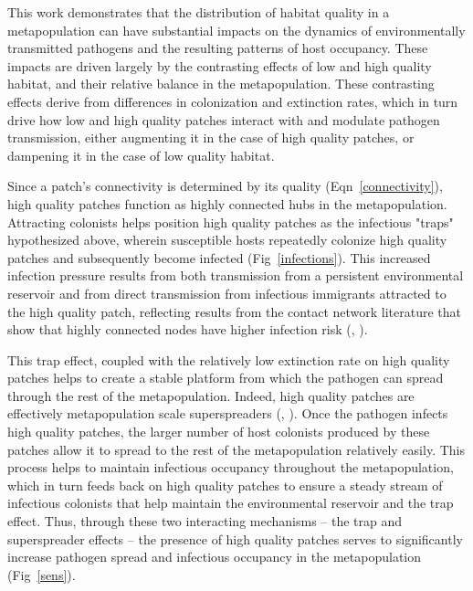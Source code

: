 \documentclass{svjour3}
\begin{document}
This work demonstrates that the distribution of habitat quality in a metapopulation can have substantial impacts on the dynamics of environmentally transmitted pathogens and the resulting patterns of host occupancy.  These impacts are driven largely by the contrasting effects of low and high quality habitat, and their relative balance in the metapopulation.  These contrasting effects derive from differences in colonization and extinction rates, which in turn drive how low and high quality patches interact with and modulate pathogen transmission, either augmenting it in the case of high quality patches, or dampening it in the case of low quality habitat.   

Since a patch's connectivity is determined by its quality (Eqn~\ref{connectivity}), high quality patches function as highly connected hubs in the metapopulation.  Attracting colonists helps position high quality patches as the infectious "traps" hypothesized above, wherein susceptible hosts repeatedly colonize high quality patches and subsequently become infected (Fig~\ref{infections}).  This increased infection pressure results from both transmission from a persistent environmental reservoir and from direct transmission from infectious immigrants attracted to the high quality patch, reflecting results from the contact network literature that show that highly connected nodes have higher infection risk (\cite{Christley2005}, \cite{Keeling2005}).  

This trap effect, coupled with the relatively low extinction rate on high quality patches helps to create a stable platform from which the pathogen can spread through the rest of the metapopulation.  Indeed, high quality patches are effectively metapopulation scale superspreaders (\cite{Lloyd-Smith2005}, \cite{Paull2012}).  Once the pathogen infects high quality patches, the larger number of host colonists produced by these patches allow it to spread to the rest of the metapopulation relatively easily.  This process helps to maintain infectious occupancy throughout the metapopulation, which in turn feeds back on high quality patches to ensure a steady stream of infectious colonists that help maintain the environmental reservoir and the trap effect.  Thus, through these two interacting mechanisms -- the trap and superspreader effects -- the presence of high quality patches serves to significantly increase pathogen spread and infectious occupancy in the metapopulation (Fig~\ref{sens}).  
\end{document}
